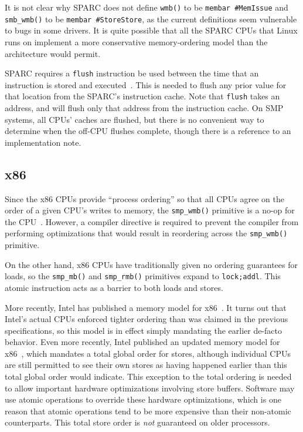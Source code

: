 It is not clear why SPARC does not define {\tt wmb()} to be
{\tt membar \#MemIssue} and {\tt smb\_wmb()} to be
{\tt membar \#StoreStore},
as the current definitions seem vulnerable to bugs in some drivers.
It is quite possible that all the SPARC CPUs that Linux runs on
implement a more conservative memory-ordering model than the architecture
would permit.

SPARC requires a {\tt flush} instruction be used between the time that
an instruction is stored and executed~\cite{SPARC94}.
This is needed to flush any prior value for that location from
the SPARC's instruction cache.
Note that {\tt flush} takes an address, and will flush only that address
from the instruction cache.
On SMP systems, all CPUs' caches are flushed, but there is no
convenient way to determine when the off-CPU flushes complete,
though there is a reference to an implementation note.

\subsection{x86}

Since the x86 CPUs provide ``process ordering'' so that all CPUs agree
on the order of a given CPU's writes to memory, the {\tt smp\_wmb()} primitive
is a no-op for the CPU~\cite{IntelXeonV3-96a}.
However, a compiler directive is required to
prevent the compiler from performing optimizations that would result
in reordering across the {\tt smp\_wmb()} primitive.

On the other hand, x86 CPUs have traditionally given
no ordering guarantees for loads, so
the {\tt smp\_mb()} and {\tt smp\_rmb()} primitives expand to {\tt lock;addl}.
This atomic instruction acts as a barrier to both loads and stores.

More recently, Intel has published a memory model for
x86~\cite{Intelx86MemoryOrdering2007}.
It turns out that Intel's actual CPUs enforced tighter ordering than
was claimed in the previous specifications, so this model is in effect
simply mandating the earlier de-facto behavior.
Even more recently, Intel published an updated memory model for
x86~\cite{Intel64IA32v3A2009}, which mandates a total global order
for stores, although individual CPUs are still permitted to see their
own stores as having happened earlier than this total global order
would indicate.
This exception to the total ordering is needed to allow important
hardware optimizations involving store buffers.
Software may use atomic operations to override these hardware optimizations,
which is one reason that atomic operations tend to be more expensive
than their non-atomic counterparts.
This total store order is \emph{not} guaranteed on older processors.

